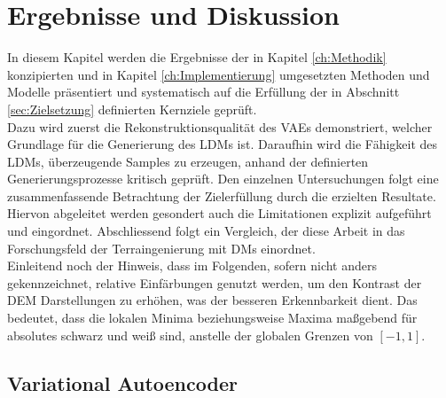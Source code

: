 \chapter{Ergebnisse und Diskussion}

In diesem Kapitel werden die Ergebnisse der in Kapitel \ref{ch:Methodik} konzipierten und in Kapitel \ref{ch:Implementierung} umgesetzten Methoden und Modelle präsentiert und systematisch auf die Erfüllung der in Abschnitt \ref{sec:Zielsetzung} definierten Kernziele geprüft. \\
Dazu wird zuerst die Rekonstruktionsqualität des \ac{VAE}s demonstriert, welcher Grundlage für die Generierung des \ac{LDM}s ist. Daraufhin wird die Fähigkeit des \ac{LDM}s, überzeugende Samples zu erzeugen, anhand der definierten Generierungsprozesse kritisch geprüft. Den einzelnen Untersuchungen folgt eine zusammenfassende Betrachtung der Zielerfüllung durch die erzielten Resultate. Hiervon abgeleitet werden gesondert auch die Limitationen explizit aufgeführt und eingordnet. Abschliessend folgt ein Vergleich, der diese Arbeit in das Forschungsfeld der Terraingenierung mit \ac{DM}s einordnet. \\
Einleitend noch der Hinweis, dass im Folgenden, sofern nicht anders gekennzeichnet, relative Einfärbungen genutzt werden, um den Kontrast der \ac{DEM} Darstellungen zu erhöhen, was der besseren Erkennbarkeit dient. Das bedeutet, dass die lokalen Minima beziehungsweise Maxima maßgebend für absolutes schwarz und weiß sind, anstelle der globalen Grenzen von $[-1, 1]$.  

\section {Variational Autoencoder}

